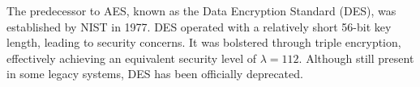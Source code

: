The predecessor to AES, known as the Data Encryption Standard (DES), was established by NIST in 1977. 
DES operated with a relatively short 56-bit key length, leading to security concerns. 
It was bolstered through triple encryption, effectively achieving an equivalent security level of $\lambda=112$. 
Although still present in some legacy systems, DES has been officially deprecated.